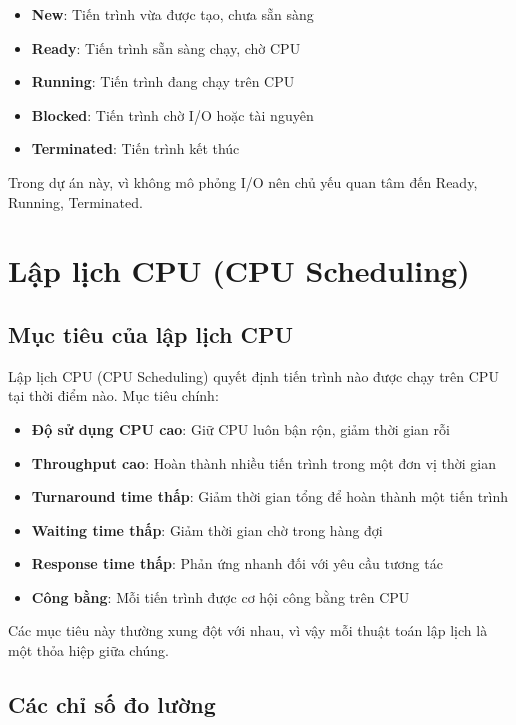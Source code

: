 \begin{itemize}[leftmargin=1.5cm]
  \item \textbf{New}: Tiến trình vừa được tạo, chưa sẵn sàng
  \item \textbf{Ready}: Tiến trình sẵn sàng chạy, chờ CPU
  \item \textbf{Running}: Tiến trình đang chạy trên CPU
  \item \textbf{Blocked}: Tiến trình chờ I/O hoặc tài nguyên
  \item \textbf{Terminated}: Tiến trình kết thúc
\end{itemize}

Trong dự án này, vì không mô phỏng I/O nên chủ yếu quan tâm đến Ready, Running, Terminated.

\section{Lập lịch CPU (CPU Scheduling)}

\subsection{Mục tiêu của lập lịch CPU}

Lập lịch CPU (CPU Scheduling) quyết định tiến trình nào được chạy trên CPU tại thời điểm nào. 
Mục tiêu chính:

\begin{itemize}[leftmargin=1.5cm]
  \item \textbf{Độ sử dụng CPU cao}: Giữ CPU luôn bận rộn, giảm thời gian rỗi
  \item \textbf{Throughput cao}: Hoàn thành nhiều tiến trình trong một đơn vị thời gian
  \item \textbf{Turnaround time thấp}: Giảm thời gian tổng để hoàn thành một tiến trình
  \item \textbf{Waiting time thấp}: Giảm thời gian chờ trong hàng đợi
  \item \textbf{Response time thấp}: Phản ứng nhanh đối với yêu cầu tương tác
  \item \textbf{Công bằng}: Mỗi tiến trình được cơ hội công bằng trên CPU
\end{itemize}

Các mục tiêu này thường xung đột với nhau, vì vậy mỗi thuật toán lập lịch là một 
thỏa hiệp giữa chúng.

\subsection{Các chỉ số đo lường}

